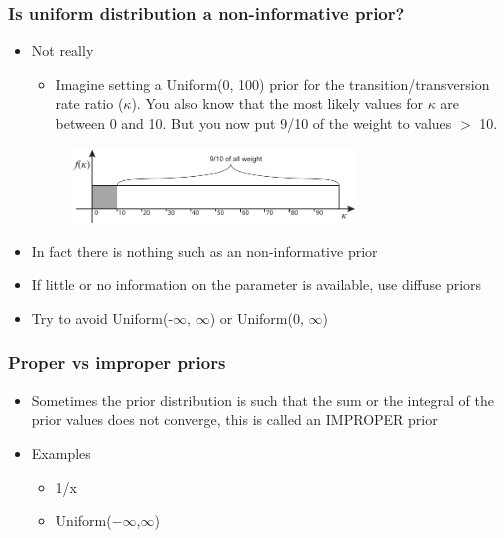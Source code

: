 \begin{frame}\frametitle{Is uniform distribution a non-informative prior?}
	\begin{itemize}
		\item Not really
		\begin{itemize}
			\item Imagine setting a Uniform(0, 100) prior for the transition/transversion rate ratio ($\kappa$). You also know that the most likely values for $\kappa$ are between 0 and 10. But you now put 9/10 of the weight to values $>$ 10.
		\end{itemize}
		\begin{figure}[h!]
    			\includegraphics[height=2cm]{figures/9tenths.pdf}
  		\end{figure}
	\end{itemize}
	\begin{itemize}
		\item In fact there is nothing such as an non-informative prior
		\item If little or no information on the parameter is available, use diffuse priors
		\item Try to avoid Uniform(-$\infty$, $\infty$) or Uniform(0, $\infty$)
	\end{itemize}
\end{frame}

\begin{frame}\frametitle{Proper vs improper priors}
	\begin{itemize}
		\item Sometimes the prior distribution is such that the sum or the integral of the prior values does not converge, this is called an IMPROPER prior
		\item Examples
		\begin{itemize}
			\item 1/x
			\item Uniform($-\infty$,$\infty$)
		\end{itemize}
	\end{itemize}
\end{frame}

